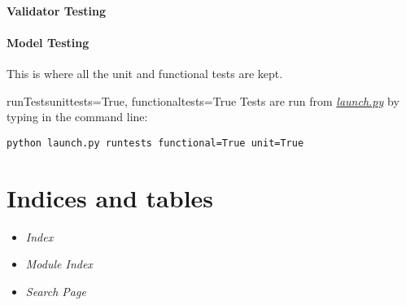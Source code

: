 \documentclass[letterpaper,10pt,english]{manual}
\begin{document}
\subsubsection{Validator Testing}
\hypertarget{module-webscavator.test.unittests.test_validators}{}
\modulesynopsis{}
\resetcurrentobjects
\hypertarget{--doc-test_models}{}

\subsubsection{Model Testing}
\hypertarget{module-webscavator.test.unittests.test_models}{}
\modulesynopsis{}
\hypertarget{module-webscavator.test.unittests}{}
\modulesynopsis{}
\hypertarget{module-webscavator.test}{}
\modulesynopsis{}
This is where all the unit and functional tests are kept.

\hypertarget{webscavator.test.runTests}{}\begin{funcdesc}{runTests}{unittests=True, functionaltests=True}
Tests are run from \hyperlink{--doc-launch}{\emph{launch.py}} by typing in the command line:

\begin{Verbatim}[commandchars=@\[\]]
python launch.py runtests functional=True unit=True
\end{Verbatim}
\end{funcdesc}


\chapter{Indices and tables}
\begin{itemize}
\item {} 
\emph{Index}

\item {} 
\emph{Module Index}

\item {} 
\emph{Search Page}

\end{itemize}


\renewcommand{\indexname}{Module Index}
\printmodindex
\renewcommand{\indexname}{Index}
\printindex
\end{document}
